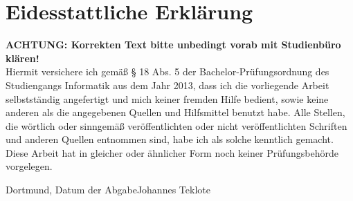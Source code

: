 \documentclass[
	oneside,  %
	ngerman, 
	final, 
	11pt, 
	a4paper, 
	1.1headlines, 
	headinclude=false, 
	footinclude=false, 
	mpinclude=false, 
	pagesize, 
	onecolumn, 
	titlepage, 
	parskip=half, 
	headsepline, 
	chapterprefix=false, 
	version=first, 
	listof=totoc, 
	bibliography=totoc, 
	toc=graduated, 
	fleqn
]{scrbook}
\newcommand*{\fhdopaperdate}{Datum der Abgabe}
\newcommand*{\fhdopaperauthor}{Johannes Teklote}
\begin{document}
\chapter*{Eidesstattliche Erklärung}
\thispagestyle{empty}
\textbf{ACHTUNG: Korrekten Text bitte unbedingt vorab mit Studienbüro klären!}\\
Hiermit versichere ich gemäß § 18 Abs. 5 der Bachelor-Prüfungsordnung des Studiengangs Informatik aus dem Jahr 2013, dass ich die  vorliegende Arbeit selbstständig angefertigt und mich keiner fremden Hilfe bedient, sowie keine anderen als die angegebenen Quellen und Hilfsmittel benutzt habe. Alle Stellen, die wörtlich oder sinngemäß veröffentlichten oder nicht veröffentlichten Schriften und anderen Quellen entnommen sind, habe ich als solche kenntlich gemacht. Diese Arbeit hat in gleicher oder ähnlicher Form noch keiner Prüfungsbehörde vorgelegen.

\vspace{1\baselineskip}%
Dortmund, \fhdopaperdate \hfill \fhdopaperauthor
\end{document}
